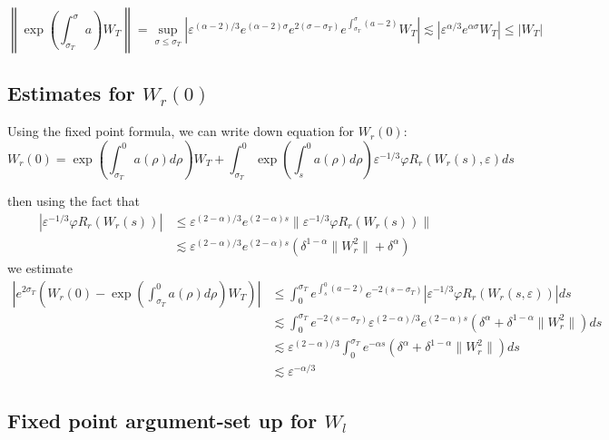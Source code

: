 \documentclass[letterpaper,11pt]{article}
\newcommand{\eps}{\varepsilon}
\newcommand{\lar}{ \lesssim }
\numberwithin{equation}{section}
\theoremstyle{plain}
\begin{document}
\[
\left\|\exp\left(\int^{\sigma}_{\sigma_T} a \right)W_T\right\| =\sup_{\sigma \le \sigma_T} |\eps^{(\alpha-2)/3} e^{(\alpha-2)\sigma}e^{2(\sigma-\sigma_T)}e^{\int_{\sigma_T}^{\sigma}(a-2)} W_T| \lar |\eps^{\alpha/3} e^{\alpha\sigma}W_T| \le |W_T|
\]
\pagebreak
\subsection{Estimates for \texorpdfstring{$W_r(0)$}{Wzero} }
Using the fixed point formula, we can write down equation for $W_r(0)$:
\[
W_r(0) = \exp\left(\int_{\sigma_T}^0 a(\rho)d\rho \right) W_T + \int_{\sigma_T}^0 \exp\left(\int_{s}^0 a(\rho)d\rho \right)\eps^{-1/3}\varphi R_r(W_r(s),\eps)ds
\]

then using the fact that 
\begin{align*}
|\eps^{-1/3}\varphi R_r(W_r(s))| &\le \eps^{(2-\alpha)/3}e^{(2-\alpha)s} \| \eps^{-1/3}\varphi R_r(W_r(s))\| \\
&\lar \eps^{(2-\alpha)/3}e^{(2-\alpha)s}\left( \delta^{1-\alpha}\|W_r^2\|+\delta^{\alpha} \right)
\end{align*}
we estimate
\begin{align*}
\left|e^{2\sigma_T}\left( W_r(0) - \exp\left(\int_{\sigma_T}^0 a(\rho)d\rho \right) W_T \right)\right| &\le \int_0^{\sigma_T} e^{\int_s^0(a-2)}e^{-2(s-\sigma_T)} |\eps^{-1/3}\varphi R_r(W_r(s,\eps))|ds \\
& \lar \int_0^{\sigma_T} e^{-2(s-\sigma_T)}\eps^{(2-\alpha)/3}e^{(2-\alpha)s}(\delta^{\alpha}+\delta^{1-\alpha}\|W_r^2\|)ds \\
&\lar  \eps^{(2-\alpha)/3}\int_0^{\sigma_T} e^{-\alpha s}(\delta^{\alpha}+\delta^{1-\alpha}\|W_r^2\|)ds\\
&\lar \eps^{-\alpha/3}
\end{align*}



\subsection{Fixed point argument-set up for \texorpdfstring{$W_{l}$}{Wplus}}
\end{document}
